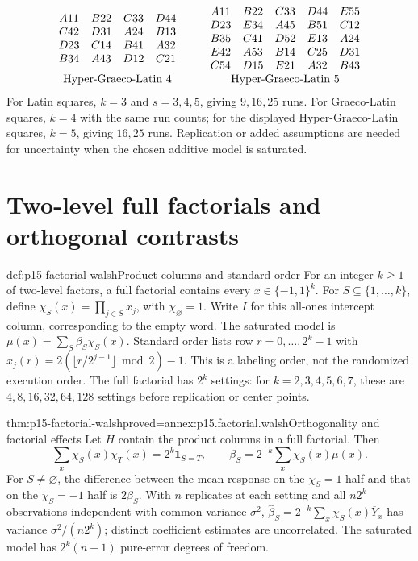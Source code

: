 \[
\begin{array}{c@{\qquad}c}
\begin{array}{cccc}A11&B22&C33&D44\\C42&D31&A24&B13\\D23&C14&B41&A32\\B34&A43&D12&C21\end{array}&
\begin{array}{ccccc}A11&B22&C33&D44&E55\\D23&E34&A45&B51&C12\\B35&C41&D52&E13&A24\\E42&A53&B14&C25&D31\\C54&D15&E21&A32&B43\end{array}\\[4pt]
\text{Hyper-Graeco-Latin }4&\text{Hyper-Graeco-Latin }5
\end{array}
\]
For Latin squares, \(k=3\) and \(s=3,4,5\), giving \(9,16,25\)
runs. For Graeco-Latin squares, \(k=4\) with the same run counts; for
the displayed Hyper-Graeco-Latin squares, \(k=5\), giving \(16,25\)
runs. Replication or added assumptions are needed for uncertainty when the
chosen additive model is saturated.

\section{Two-level full factorials and orthogonal contrasts}
\label{sec:p15-factorial-full}

\begin{hbdefinition}{def:p15-factorial-walsh}{Product columns and standard order}
For an integer \(k\geq1\) of two-level factors, a full factorial contains every
\(x\in\{-1,1\}^k\). For \(S\subseteq\{1,\ldots,k\}\), define
\(\chi_S(x)=\prod_{j\in S}x_j\), with \(\chi_\varnothing=1\).
Write \(I\) for this all-ones intercept column, corresponding to the empty word.
The saturated model is
\(\mu(x)=\sum_S\beta_S\chi_S(x)\).
Standard order lists row \(r=0,\ldots,2^k-1\) with
\(x_j(r)=2(\lfloor r/2^{j-1}\rfloor\bmod2)-1\).
This is a labeling order, not the randomized execution order.
The full factorial has \(2^k\) settings: for \(k=2,3,4,5,6,7\), these
are \(4,8,16,32,64,128\) settings before replication or center points.
\end{hbdefinition}

\begin{hbtheorem}{thm:p15-factorial-walsh}{proved=annex:p15.factorial.walsh}{Orthogonality and factorial effects}
Let \(H\) contain the product columns in a full factorial. Then
\[
 \sum_x\chi_S(x)\chi_T(x)=2^k\mathbf1_{S=T},
 \qquad \beta_S=2^{-k}\sum_x\chi_S(x)\mu(x).
\]
For \(S\ne\varnothing\), the difference between the mean response on
the \(\chi_S=1\) half and that on the \(\chi_S=-1\) half is
\(2\beta_S\). With \(n\) replicates at each setting and all
\(n2^k\) observations independent with common variance \(\sigma^2\),
\(\widehat\beta_S=2^{-k}\sum_x\chi_S(x)\overline Y_x\)
has variance \(\sigma^2/(n2^k)\); distinct coefficient estimates are
uncorrelated. The saturated model has \(2^k(n-1)\) pure-error degrees
of freedom.
\end{hbtheorem}

